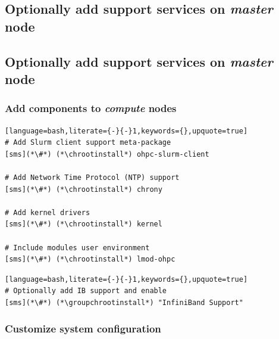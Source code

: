 \documentclass[letterpaper]{article}
\newcommand{\chrootinstall}{psh compute dnf -y install}
\newcommand{\groupchrootinstall}{psh compute dnf -y groupinstall}
\begin{document}
\subsection{Optionally add \InfiniBand{} support services on {\em master} node} \label{sec:add_ofed}

\vspace*{0.3cm}
\subsection{Optionally add \OmniPath{} support services on {\em master} node} \label{sec:add_opa}


\clearpage
\subsubsection{Add \OHPC{} components to {\em compute} nodes} \label{sec:add_components}


\begin{lstlisting}[language=bash,literate={-}{-}1,keywords={},upquote=true]
# Add Slurm client support meta-package
[sms](*\#*) (*\chrootinstall*) ohpc-slurm-client

# Add Network Time Protocol (NTP) support
[sms](*\#*) (*\chrootinstall*) chrony

# Add kernel drivers
[sms](*\#*) (*\chrootinstall*) kernel

# Include modules user environment
[sms](*\#*) (*\chrootinstall*) lmod-ohpc
\end{lstlisting}

\begin{lstlisting}[language=bash,literate={-}{-}1,keywords={},upquote=true]
# Optionally add IB support and enable
[sms](*\#*) (*\groupchrootinstall*) "InfiniBand Support"
\end{lstlisting}

\vspace*{-0.25cm}
\subsubsection{Customize system configuration} \label{sec:master_customization}

\end{document}
